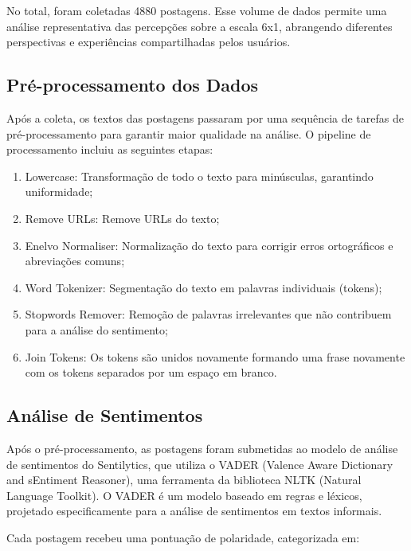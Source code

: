 \documentclass[
	12pt,				%
	oneside,			%
	a4paper,			%
	english,			%
	french,				%
	spanish,			%
	brazil				%
	]{abntex2}
\begin{document}
No total, foram coletadas 4880 postagens. Esse volume de dados permite
uma análise representativa das percepções sobre a escala 6x1, abrangendo
diferentes perspectivas e experiências compartilhadas pelos usuários.

\hypertarget{pruxe9-processamento-dos-dados}{%
\subsection{Pré-processamento dos
Dados}\label{pruxe9-processamento-dos-dados}}

Após a coleta, os textos das postagens passaram por uma sequência de
tarefas de pré-processamento para garantir maior qualidade na análise. O
pipeline de processamento incluiu as seguintes etapas:

\begin{enumerate}
\def\labelenumi{\arabic{enumi})}
\tightlist
\item
  Lowercase: Transformação de todo o texto para minúsculas, garantindo
  uniformidade;
\item
  Remove URLs: Remove URLs do texto;
\item
  Enelvo Normaliser: Normalização do texto para corrigir erros
  ortográficos e abreviações comuns;
\item
  Word Tokenizer: Segmentação do texto em palavras individuais (tokens);
\item
  Stopwords Remover: Remoção de palavras irrelevantes que não contribuem
  para a análise do sentimento;
\item
  Join Tokens: Os tokens são unidos novamente formando uma frase
  novamente com os tokens separados por um espaço em branco.
\end{enumerate}

\hypertarget{anuxe1lise-de-sentimentos}{%
\subsection{Análise de Sentimentos}\label{anuxe1lise-de-sentimentos}}

Após o pré-processamento, as postagens foram submetidas ao modelo de
análise de sentimentos do Sentilytics, que utiliza o VADER (Valence
Aware Dictionary and sEntiment Reasoner), uma ferramenta da biblioteca
NLTK (Natural Language Toolkit). O VADER é um modelo baseado em regras e
léxicos, projetado especificamente para a análise de sentimentos em
textos informais.

Cada postagem recebeu uma pontuação de polaridade, categorizada em:
\end{document}
